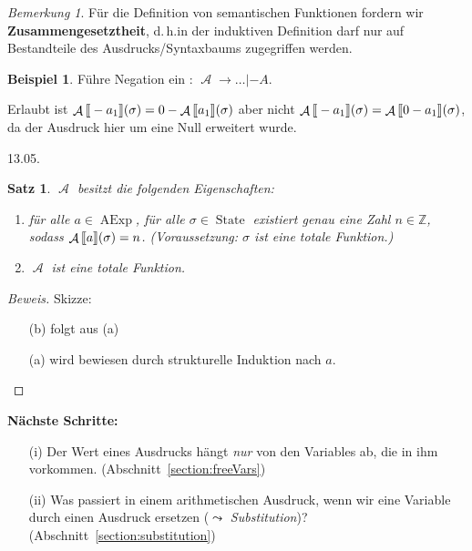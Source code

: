 \documentclass[a4paper,12pt]{article}
\theoremstyle{definition}
\newtheorem*{example}{Beispiel}
\theoremstyle{plain}
\newtheorem{theorem}{Satz}[section]
\theoremstyle{remark}
\newtheorem*{remark}{Bemerkung}
\newcommand{\lsem}{\mathrm{[}\kern-.14em\mathrm{[}}
\newcommand{\rsem}{\mathrm{]}\kern-.14em\mathrm{]}}
\renewcommand{\dh}{d.\,h.\;}
\newcommand{\secref}[1]{Abschnitt~\ref{#1}}
\DeclareMathOperator{\AExp}{AExp}
\DeclareMathOperator{\State}{State}
\DeclareMathOperator{\A}{\mathcal{A}}
\begin{document}
\begin{remark}
    Für die Definition von semantischen Funktionen fordern wir \textbf{Zusammengesetztheit}, \dh in der induktiven Definition darf nur auf Bestandteile des Ausdrucks/Syntaxbaums zugegriffen werden.
\end{remark}

\begin{example}
    Führe Negation ein : $\A \to \dots | -A$.

    Erlaubt ist $\A\lsem -a_1 \rsem(\sigma) = 0 - \A\lsem a_1 \rsem(\sigma)$ aber nicht $\A\lsem -a_1 \rsem(\sigma) = \A\lsem 0 - a_1 \rsem(\sigma)$, da der Ausdruck hier um eine Null erweitert wurde.
\end{example}



\newpage
\hfill 13.05.

\begin{theorem}
    $\A$ besitzt die folgenden Eigenschaften:
    \begin{enumerate}
        \item für alle $a \in \AExp$, für alle $\sigma \in \State$ existiert genau eine Zahl $n \in \mathbb{Z}$, sodass $\A\lsem a \rsem (\sigma) = n$. (Voraussetzung: $\sigma$ ist eine totale Funktion.)
        \item $\A$ ist eine totale Funktion.
    \end{enumerate}
\end{theorem}

\begin{proof}[Beweis]
    Skizze:
    \begin{enumerate}
        \item[(b)] folgt aus (a)
        \item[(a)] wird bewiesen durch strukturelle Induktion nach $a$.
    \end{enumerate}
\end{proof}

\par\bigskip
\textbf{Nächste Schritte:}
\begin{enumerate}
    \item[(i)] Der Wert eines Ausdrucks hängt \emph{nur} von den Variables ab, die in ihm vorkommen. (\secref{section:freeVars})
    \item[(ii)] Was passiert in einem arithmetischen Ausdruck, wenn wir eine Variable durch einen Ausdruck ersetzen ($\leadsto$ \emph{Substitution})? (\secref{section:substitution})
\end{enumerate}
\end{document}

